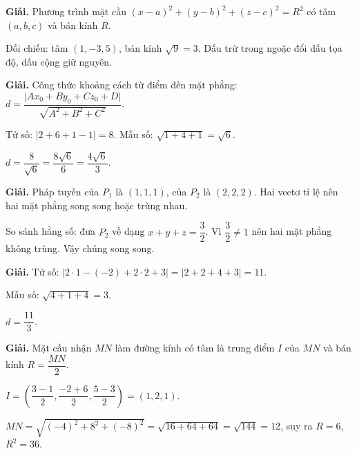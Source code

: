 \documentclass[11pt, a4paper]{article}
\begin{document}
\begin{dapan}[1 — Đáp án C]

\textbf{Giải.} Phương trình mặt cầu $(x-a)^2 + (y-b)^2 + (z-c)^2 = R^2$ có tâm $(a,b,c)$ và bán kính $R$.

Đối chiếu: tâm $(1,-3,5)$, bán kính $\sqrt{9} = 3$. Dấu trừ trong ngoặc đổi dấu tọa độ, dấu cộng giữ nguyên.


\end{dapan}
\vspace{0.3cm}
\begin{dapan}[2 — Đáp án A]

\textbf{Giải.} Công thức khoảng cách từ điểm đến mặt phẳng: $d = \dfrac{\lvert Ax_0+By_0+Cz_0+D \rvert}{\sqrt{A^2+B^2+C^2}}$.

Tử số: $\lvert 2 + 6 + 1 - 1 \rvert = 8$. Mẫu số: $\sqrt{1+4+1} = \sqrt{6}$.

$d = \dfrac{8}{\sqrt{6}} = \dfrac{8\sqrt{6}}{6} = \dfrac{4\sqrt{6}}{3}$.


\end{dapan}
\vspace{0.3cm}
\begin{dapan}[3 — Đáp án D]

\textbf{Giải.} Pháp tuyến của $P_1$ là $(1,1,1)$, của $P_2$ là $(2,2,2)$. Hai vectơ tỉ lệ nên hai mặt phẳng song song hoặc trùng nhau.

So sánh hằng số: đưa $P_2$ về dạng $x+y+z = \dfrac{3}{2}$. Vì $\dfrac{3}{2} \ne 1$ nên hai mặt phẳng không trùng. Vậy chúng song song.


\end{dapan}
\vspace{0.3cm}
\begin{dapan}[4 — Đáp án C]

\textbf{Giải.} Tử số: $\lvert 2 \cdot 1 - (-2) + 2 \cdot 2 + 3 \rvert = \lvert 2 + 2 + 4 + 3 \rvert = 11$.

Mẫu số: $\sqrt{4+1+4} = 3$.

$d = \dfrac{11}{3}$.


\end{dapan}
\vspace{0.3cm}
\begin{dapan}[5 — Đáp án A]

\textbf{Giải.} Mặt cầu nhận $MN$ làm đường kính có tâm là trung điểm $I$ của $MN$ và bán kính $R = \dfrac{MN}{2}$.

$I = \left(\dfrac{3-1}{2}, \dfrac{-2+6}{2}, \dfrac{5-3}{2}\right) = (1,2,1)$.

$MN = \sqrt{(-4)^2 + 8^2 + (-8)^2} = \sqrt{16+64+64} = \sqrt{144} = 12$, suy ra $R = 6$, $R^2 = 36$.


\end{dapan}
\end{document}
